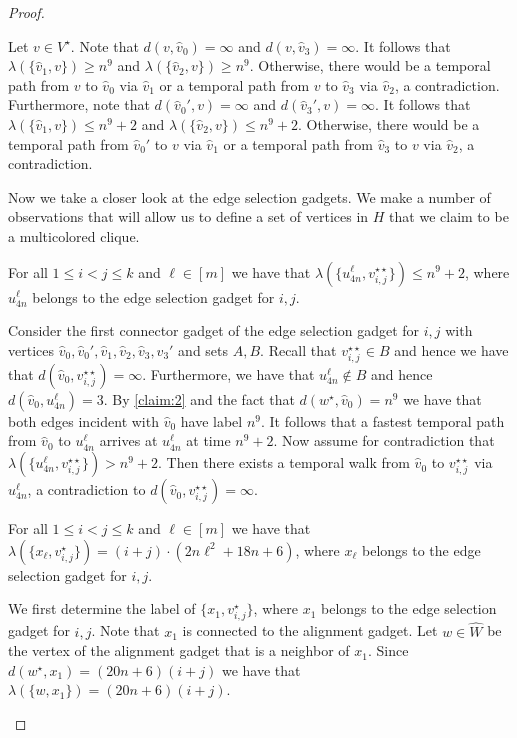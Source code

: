 \documentclass[a4paper,UKenglish,cleveref, autoref, thm-restate, anonymous]{lipics-v2021}
\begin{document}
\begin{proof}
\begin{claimproof}
%    
Let $v\in V^\star$. Note that $d(v,\hat{v}_0)=\infty$ and $d(v,\hat{v}_3)=\infty$. It follows that $\lambda(\{\hat{v}_1,v\})\ge n^9$ and $\lambda(\{\hat{v}_2,v\})\ge n^9$. Otherwise, there would be a temporal path from $v$ to $\hat{v}_0$ via $\hat{v}_1$ or a temporal path from $v$ to $\hat{v}_3$ via $\hat{v}_2$, a contradiction.
Furthermore, note that $d(\hat{v}_0',v)=\infty$ and $d(\hat{v}_3',v)=\infty$. It follows that $\lambda(\{\hat{v}_1,v\})\le n^9+2$ and $\lambda(\{\hat{v}_2,v\})\le n^9+2$. Otherwise, there would be a temporal path from $\hat{v}_0'$ to $v$ via $\hat{v}_1$ or a temporal path from $\hat{v}_3$ to $v$ via $\hat{v}_2$, a contradiction.
\end{claimproof}

Now we take a closer look at the edge selection gadgets. We make a number of observations that will allow us to define a set of vertices in $H$ that we claim to be a multicolored clique.

\begin{claim}\label{claim:3}
    For all $1\le i<j\le k$ and $\ell\in[m]$ we have that $\lambda(\{u^\ell_{4n},v_{i,j}^{\star\star}\})\le n^9+2$, where $u^\ell_{4n}$ belongs to the edge selection gadget for $i,j$.
\end{claim}
\begin{claimproof}
    Consider the first connector gadget of the edge selection gadget for $i,j$ with vertices $\hat{v}_0,\hat{v}_0',\hat{v}_1,\hat{v}_2,\hat{v}_3,\hat{v}_3'$ and sets $A,B$. Recall that $v_{i,j}^{\star\star}\in B$ and hence we have that $d(\hat{v}_0,v_{i,j}^{\star\star})=\infty$. Furthermore, we have that $u^\ell_{4n}\notin B$ and hence $d(\hat{v}_0,u^\ell_{4n})=3$. By \cref{claim:2} and the fact that $d(w^\star,\hat{v}_0)=n^9$ we have that both edges incident with $\hat{v}_0$ have label $n^9$. It follows that a fastest temporal path from $\hat{v}_0$ to $u^\ell_{4n}$ arrives at $u^\ell_{4n}$ at time $n^9+2$. Now assume for contradiction that $\lambda(\{u^\ell_{4n},v_{i,j}^{\star\star}\})> n^9+2$. Then there exists a temporal walk from $\hat{v}_0$ to $v_{i,j}^{\star\star}$ via $u^\ell_{4n}$, a contradiction to $d(\hat{v}_0,v_{i,j}^{\star\star})=\infty$.
\end{claimproof}

\begin{claim}\label{claim:4}
    For all $1\le i<j\le k$ and $\ell\in[m]$ we have that $\lambda(\{x_\ell,v_{i,j}^{\star}\})=(i+j)\cdot (2n\ell^2 +18n+6)$, where $x_\ell$ belongs to the edge selection gadget for $i,j$.
\end{claim}
\begin{claimproof}
    We first determine the label of $\{x_1,v_{i,j}^{\star}\}$, where $x_1$ belongs to the edge selection gadget for $i,j$. Note that $x_1$ is connected to the alignment gadget. Let $w\in \hat{W}$ be the vertex of the alignment gadget that is a neighbor of $x_1$. Since $d(w^\star,x_1)=(20n+6)(i+j)$ we have that $\lambda(\{w,x_1\})=(20n+6)(i+j)$. 


\end{claimproof}
\end{proof}
\end{document}
